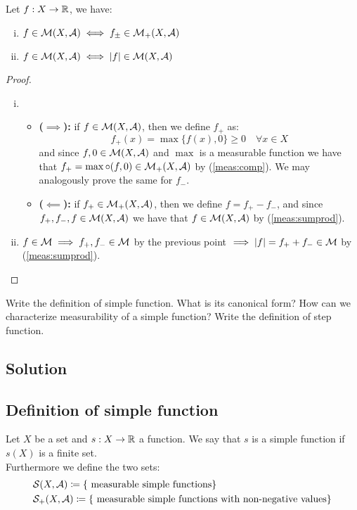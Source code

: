 Let $f:X\to\mathbb{R}$, we have:
\begin{enumerate}[i)]
    \item $f \in \mathcal{M}(X, \mathcal{A}) \iff f_{\pm} \in \mathcal{M}_+(X, \mathcal{A})$
    \item $f \in \mathcal{M}(X, \mathcal{A}) \iff |f| \in \mathcal{M}(X, \mathcal{A})$
\end{enumerate}

\begin{proof}
    \hspace*{\fill} %
    \begin{enumerate} [i)]
        \item \begin{itemize}
                  \item \textbf{($\implies$):} if $f \in \mathcal{M}(X, \mathcal{A})$, then we define $f_+$ as:
                        \[
                            f_+(x) = \max\{f(x),0\} \geq 0 \quad \forall x\in X
                        \]
                        and since $f,0 \in \mathcal{M}(X,\mathcal{A})$ and $\max$ is a measurable function we have that $f_+ = \max \circ (f,0) \in \mathcal{M}_+(X,\mathcal{A})$ by (\ref{meas:comp}). We may analogously prove the same for $f_-$.
                  \item \textbf{($\impliedby$):} if $f_+ \in \mathcal{M}_+(X, \mathcal{A})$, then we define $f = f_+ - f_-$, and since $f_+,f_-,f \in \mathcal{M}(X,\mathcal{A})$ we have that $f \in \mathcal{M}(X,\mathcal{A})$ by (\ref{meas:sumprod}).
              \end{itemize}
        \item $f\in\mathcal{M} \implies f_{+}, f_{-} \in \mathcal{M}$ by the previous point $\implies |f|=f_+ + f_- \in \mathcal{M}$ by (\ref{meas:sumprod}).
    \end{enumerate}
\end{proof}


\question

Write the definition of simple function. What is its canonical form? How can we characterize measurability of a simple function? Write the definition of step function.

\subsection*{Solution}

\subsection{Definition of simple function}
Let $X$ be a set and $s:X\to\mathbb{R}$ a function. We say that $s$ is a simple function if $s(X)$ is a finite set. \\
Furthermore we define the two sets:
\begin{align*}
     & \mathcal{S}(X, \mathcal{A}) \coloneqq \{ \text{ measurable simple functions}  \}                           \\
     & \mathcal{S}_+(X, \mathcal{A}) \coloneqq \{ \text{ measurable simple functions with non-negative values} \}
\end{align*}

